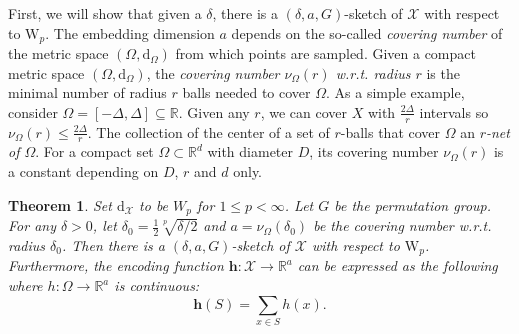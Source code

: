 \documentclass[12pt]{article}
\newcommand{\R}{\mathbb R}
\newtheorem{theorem}{Theorem}[section]
\newcommand{\yusu}[1]		{{ \textcolor{darkgreen} {{\sc [Yusu]:} #1}}}
\begin{document}
First, we will show that given a $\delta$, there is a $(\delta, a, G)$-sketch of $\mathcal{X}$ with respect to $\mathrm{W}_p$. 
The embedding dimension $a$ depends on the so-called \emph{covering number} of the metric space $(\Omega, \mathrm{d}_\Omega)$ from which points are sampled. 
Given a compact metric space $(\Omega, \mathrm{d}_\Omega)$, the \emph{covering number $\nu_\Omega(r)$ w.r.t. radius $r$} is the minimal number of radius $r$ balls needed to cover $\Omega$. As a simple example, consider $\Omega = [-\Delta, \Delta] \subseteq \R$. Given any $r$, we can cover $X$ with $\frac{2\Delta}{r}$ intervals so $\nu_\Omega(r) \leq \frac{2\Delta}{r}$. 
The collection of the center of a set of $r$-balls that cover $\Omega$ an \emph{$r$-net of $\Omega$}. 
For a compact set $\Omega \subset \R^d$ with diameter $D$, its covering number $\nu_\Omega(r)$ is a constant depending on $D$, $r$ and $d$ only.

\begin{theorem}
\label{lemma:point-sketch}
    Set $\mathrm{d}_{\mathcal{X}}$ to be $W_p$ for $1 \leq p < \infty$. Let $G$ be the permutation group. 
    For any $\delta > 0$, let $\delta_0 = \frac{1}{2}\sqrt[p]{\delta/2}$ and $a = \nu_\Omega(\delta_0)$ be the covering number w.r.t. radius $\delta_0$. 
    Then there is a $(\delta, a, G)$-sketch of $\mathcal{X}$ with respect to $\mathrm{W}_p$. 
    Furthermore, the encoding function $\mathbf{h}: \mathcal{X} \to \R^a$ can be expressed as the following where $h: \Omega \to \R^a$ is continuous: 
    \begin{equation}\label{eqn:hdecomp} 
        \mathbf{h}(S) = \sum_{x \in S} h(x) . 
    \end{equation}
\end{theorem}
\end{document}
